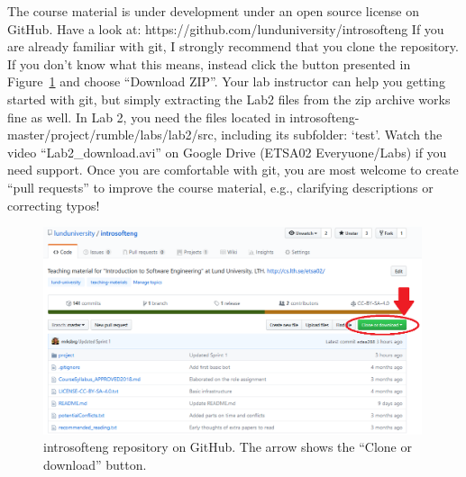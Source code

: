 \documentclass{scrreprt}
\begin{document}
The course material is under development under an open source license on GitHub. Have a look at: https://github.com/lunduniversity/introsofteng
If you are already familiar with git, I strongly recommend that you clone the repository. If you don't know what this means, instead click the button presented in Figure~\ref{fig:github} and choose ``Download ZIP''. Your lab instructor can help you getting started with git, but simply extracting the Lab2 files from the zip archive works fine as well. In Lab 2, you need the files located in introsofteng-master/project/rumble/labs/lab2/src, including its subfolder: `test'. Watch the video ``Lab2_download.avi'' on Google Drive (ETSA02 Everyuone/Labs) if you need support. Once you are comfortable with git, you are most welcome to create ``pull requests'' to improve the course material, e.g., clarifying descriptions or correcting typos!

\begin{figure}
\centering
\includegraphics[width=0.99\textwidth]{figures/GitHub.png}
\caption{introsofteng repository on GitHub. The arrow shows the ``Clone or download'' button.}
\label{fig:github}
\end{figure}
\end{document}
